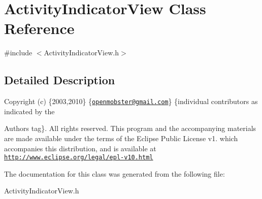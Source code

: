 \hypertarget{interface_activity_indicator_view}{
\section{\-Activity\-Indicator\-View \-Class \-Reference}
\label{interface_activity_indicator_view}
}


{\ttfamily \#include $<$\-Activity\-Indicator\-View.\-h$>$}



\subsection{\-Detailed \-Description}
\-Copyright (c) \{2003,2010\} \{\href{mailto:openmobster@gmail.com}{\tt openmobster@gmail.\-com}\} \{individual contributors as indicated by the \begin{DoxyAuthor}{\-Authors}
tag\}. \-All rights reserved. \-This program and the accompanying materials are made available under the terms of the \-Eclipse \-Public \-License v1. which accompanies this distribution, and is available at \href{http://www.eclipse.org/legal/epl-v10.html}{\tt http\-://www.\-eclipse.\-org/legal/epl-\/v10.\-html} 
\end{DoxyAuthor}


\-The documentation for this class was generated from the following file\-:\begin{DoxyCompactItemize}
\item 
\-Activity\-Indicator\-View.\-h\end{DoxyCompactItemize}
